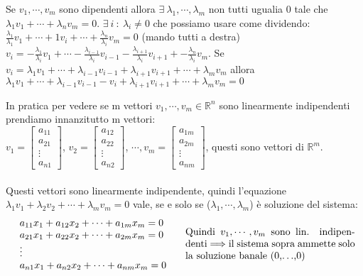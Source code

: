 \begin{demostration}
Se $v_1, \cdots, v_m$ sono dipendenti allora $\exists \: \lambda_1, \cdots, \lambda_m$ non tutti ugualia 0 tale che $\lambda_1 v_1 + \cdots + \lambda_n v_m = 0$. $\exists \: i \: : \: \lambda_i \neq 0$ che possiamo usare come dividendo: $\frac{\lambda_1}{\lambda_1} v_1 + \cdots + 1v_i + \cdots + \frac{\lambda_n}{\lambda_i} v_m = 0$
(mando tutti a destra) $v_i = -\frac{\lambda_1}{\lambda_i} v_1 + \cdots - \frac{\lambda_{i-1}}{\lambda_i}v_{i-1} - \frac{\lambda_{i+1}}{\lambda_i}v_{i+1} + -\frac{\lambda_n}{\lambda_i} v_m$.
Se $v_i = \lambda_1 v_1 + \cdots + \lambda_{i-1}v_{i-1} + \lambda_{i+1}v_{i+1} + \cdots + \lambda_m v_m$ allora $ \lambda_1 v_1 + \cdots + \lambda_{i-1}v_{i-1} - v_i + \lambda_{i+1}v_{i+1} + \cdots + \lambda_m v_m = 0$
\end{demostration}
\hspace{-15pt}In pratica per vedere se m vettori $v_1, \cdots, v_m \in \mathbb{R}^n$ sono linearmente indipendenti prendiamo innanzitutto m vettori:\\
$v_1 = \begin{bmatrix}a_{11} \\ a_{21} \\ \vdots \\ a_{n1}\end{bmatrix}$, $v_2 = \begin{bmatrix}a_{12}\\a_{22}\\\vdots\\ a_{n2}\end{bmatrix}$, $\cdots, v_m = \begin{bmatrix}a_{1m}\\a_{2m}\\\vdots\\ a_{nm}\end{bmatrix}$, questi sono vettori di $\mathbb{R}^m$.\\\\
Questi vettori sono linearmente indipendente, quindi l'equazione $\lambda_1v_1 + \lambda_2 v_2 + \cdots + \lambda_mv_m = 0$ vale, se e solo se ($\lambda_1, \cdots, \lambda_m$) è soluzione del sistema:
\[
\begin{array}{l}
     a_{11}x_1 + a_{12}x_2 + \cdots + a_{1m}x_m = 0\\
     a_{21}x_1 + a_{22}x_2 + \cdots + a_{2m}x_m = 0\\
     \vdots\\
     a_{n1}x_1 + a_{n2}x_2 + \cdots + a_{nm}x_m = 0\\
\end{array}
\hspace{.5cm}
\parbox{6cm}{Quindi $v_1, \cdots, v_m$ sono lin. indipendenti $\Longrightarrow$ il sistema sopra ammette solo la soluzione banale (0,$\ldots$,0)}
\]
